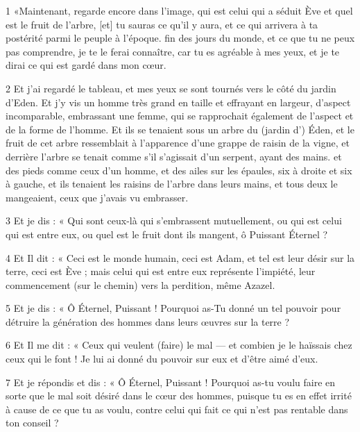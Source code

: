 
\par 1 «Maintenant, regarde encore dans l'image, qui est celui qui a séduit Ève et quel est le fruit de l'arbre, [et] tu sauras ce qu'il y aura, et ce qui arrivera à ta postérité parmi le peuple à l'époque. fin des jours du monde, et ce que tu ne peux pas comprendre, je te le ferai connaître, car tu es agréable à mes yeux, et je te dirai ce qui est gardé dans mon cœur.

\par 2 Et j'ai regardé le tableau, et mes yeux se sont tournés vers le côté du jardin d'Eden. Et j'y vis un homme très grand en taille et effrayant en largeur, d'aspect incomparable, embrassant une femme, qui se rapprochait également de l'aspect et de la forme de l'homme. Et ils se tenaient sous un arbre du (jardin d') Éden, et le fruit de cet arbre ressemblait à l'apparence d'une grappe de raisin de la vigne, et derrière l'arbre se tenait comme s'il s'agissait d'un serpent, ayant des mains. et des pieds comme ceux d'un homme, et des ailes sur les épaules, six à droite et six à gauche, et ils tenaient les raisins de l'arbre dans leurs mains, et tous deux le mangeaient, ceux que j'avais vu embrasser.

\par 3 Et je dis : « Qui sont ceux-là qui s'embrassent mutuellement, ou qui est celui qui est entre eux, ou quel est le fruit dont ils mangent, ô Puissant Éternel ?

\par 4 Et Il dit : « Ceci est le monde humain, ceci est Adam, et tel est leur désir sur la terre, ceci est Ève ; mais celui qui est entre eux représente l'impiété, leur commencement (sur le chemin) vers la perdition, même Azazel.

\par 5 Et je dis : « Ô Éternel, Puissant ! Pourquoi as-Tu donné un tel pouvoir pour détruire la génération des hommes dans leurs œuvres sur la terre ?

\par 6 Et Il me dit : « Ceux qui veulent (faire) le mal — et combien je le haïssais chez ceux qui le font ! Je lui ai donné du pouvoir sur eux et d'être aimé d'eux.

\par 7 Et je répondis et dis : « Ô Éternel, Puissant ! Pourquoi as-tu voulu faire en sorte que le mal soit désiré dans le cœur des hommes, puisque tu es en effet irrité à cause de ce que tu as voulu, contre celui qui fait ce qui n'est pas rentable dans ton conseil ?

